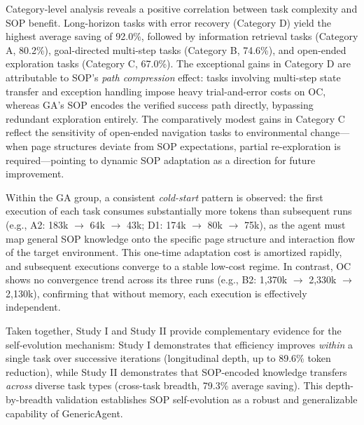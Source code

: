 Category-level analysis reveals a positive correlation between task complexity and SOP benefit. Long-horizon tasks with error recovery (Category D) yield the highest average saving of 92.0\%, followed by information retrieval tasks (Category A, 80.2\%), goal-directed multi-step tasks (Category B, 74.6\%), and open-ended exploration tasks (Category C, 67.0\%). The exceptional gains in Category D are attributable to SOP's \emph{path compression} effect: tasks involving multi-step state transfer and exception handling impose heavy trial-and-error costs on OC, whereas GA's SOP encodes the verified success path directly, bypassing redundant exploration entirely. The comparatively modest gains in Category C reflect the sensitivity of open-ended navigation tasks to environmental change—when page structures deviate from SOP expectations, partial re-exploration is required—pointing to dynamic SOP adaptation as a direction for future improvement.

Within the GA group, a consistent \emph{cold-start} pattern is observed: the first execution of each task consumes substantially more tokens than subsequent runs (e.g., A2: 183k $\rightarrow$ 64k $\rightarrow$ 43k; D1: 174k $\rightarrow$ 80k $\rightarrow$ 75k), as the agent must map general SOP knowledge onto the specific page structure and interaction flow of the target environment. This one-time adaptation cost is amortized rapidly, and subsequent executions converge to a stable low-cost regime. In contrast, OC shows no convergence trend across its three runs (e.g., B2: 1,370k $\rightarrow$ 2,330k $\rightarrow$ 2,130k), confirming that without memory, each execution is effectively independent.

Taken together, Study I and Study II provide complementary evidence for the self-evolution mechanism: Study I demonstrates that efficiency improves \emph{within} a single task over successive iterations (longitudinal depth, up to 89.6\% token reduction), while Study II demonstrates that SOP-encoded knowledge transfers \emph{across} diverse task types (cross-task breadth, 79.3\% average saving). This depth-by-breadth validation establishes SOP self-evolution as a robust and generalizable capability of GenericAgent.
